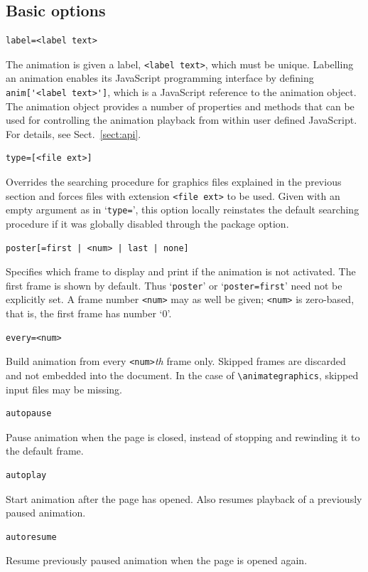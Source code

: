 \documentclass[a4paper]{article}
\begin{document}
\subsection{Basic options}
\begin{verbatim}
label=<label text>
\end{verbatim}
The animation is given a label, \verb+<label text>+, which must be unique. Labelling an animation enables its JavaScript programming interface by defining \verb+anim['<label text>']+, which is a JavaScript reference to the animation object. The animation object provides a number of properties and methods that can be used for controlling the animation playback from within user defined JavaScript. For details, see Sect.~\ref{sect:api}.
\begin{verbatim}
type=[<file ext>]
\end{verbatim}
Overrides the searching procedure for graphics files explained in the previous section and forces files with extension \verb+<file ext>+ to be used. Given with an empty argument as in `\verb+type=+', this option locally reinstates the default searching procedure if it was globally disabled through the package option.
\begin{verbatim}
poster[=first | <num> | last | none]
\end{verbatim}
Specifies which frame to display and print if the animation is not activated. The first frame is shown by default. Thus `\verb+poster+' or `\verb+poster=first+' need not be explicitly set. A frame number \verb+<num>+ may as well be given; \verb+<num>+ is zero-based, that is, the first frame has number `0'.
\begin{verbatim}
every=<num>
\end{verbatim}
Build animation from every \verb+<num>+\emph{th} frame only. Skipped frames are discarded and not embedded into the document. In the case of \verb+\animategraphics+, skipped input files may be missing.
\begin{verbatim}
autopause
\end{verbatim}
Pause animation when the page is closed, instead of stopping and rewinding it to the default frame.
\begin{verbatim}
autoplay
\end{verbatim}
Start animation after the page has opened. Also resumes playback of a previously paused animation.
\begin{verbatim}
autoresume
\end{verbatim}
Resume previously paused animation when the page is opened again.
\end{document}
